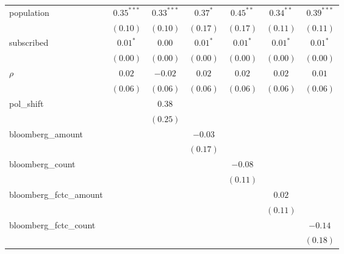 \begin{table}[!h]
\begin{center}
\begin{tabular}{l c c c c c c }
population              & $0.35^{***}$  & $0.33^{***}$ & $0.37^{*}$    & $0.45^{**}$   & $0.34^{**}$   & $0.39^{***}$  \\
                        & $(0.10)$      & $(0.10)$     & $(0.17)$      & $(0.17)$      & $(0.11)$      & $(0.11)$      \\
subscribed              & $0.01^{*}$    & $0.00$       & $0.01^{*}$    & $0.01^{*}$    & $0.01^{*}$    & $0.01^{*}$    \\
                        & $(0.00)$      & $(0.00)$     & $(0.00)$      & $(0.00)$      & $(0.00)$      & $(0.00)$      \\
$\rho$                  & $0.02$        & $-0.02$      & $0.02$        & $0.02$        & $0.02$        & $0.01$        \\
                        & $(0.06)$      & $(0.06)$     & $(0.06)$      & $(0.06)$      & $(0.06)$      & $(0.06)$      \\
pol\_shift              &               & $0.38$       &               &               &               &               \\
                        &               & $(0.25)$     &               &               &               &               \\
bloomberg\_amount       &               &              & $-0.03$       &               &               &               \\
                        &               &              & $(0.17)$      &               &               &               \\
bloomberg\_count        &               &              &               & $-0.08$       &               &               \\
                        &               &              &               & $(0.11)$      &               &               \\
bloomberg\_fctc\_amount &               &              &               &               & $0.02$        &               \\
                        &               &              &               &               & $(0.11)$      &               \\
bloomberg\_fctc\_count  &               &              &               &               &               & $-0.14$       \\
                        &               &              &               &               &               & $(0.18)$      \\
\midrule

\end{tabular}
\end{center}
\end{table}

